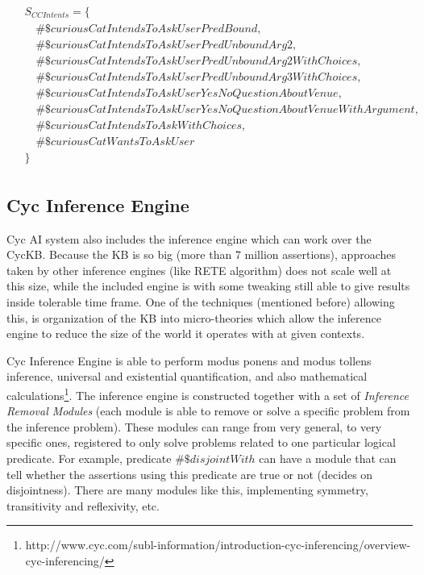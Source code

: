 \begin{equation}\label{as:cycCCAssertions}
\begin{gathered}
\begin{aligned}
&S_{CC Intents}=\{\\
&\quad\#\$curiousCatIntendsToAskUserPredBound,\\
&\quad\#\$curiousCatIntendsToAskUserPredUnboundArg2,\\
&\quad\#\$curiousCatIntendsToAskUserPredUnboundArg2WithChoices,\\
&\quad\#\$curiousCatIntendsToAskUserPredUnboundArg3WithChoices,\\
&\quad\#\$curiousCatIntendsToAskUserYesNoQuestionAboutVenue,\\
&\quad\#\$curiousCatIntendsToAskUserYesNoQuestionAboutVenueWithArgument,\\
&\quad\#\$curiousCatIntendsToAskWithChoices,\\
&\quad\#\$curiousCatWantsToAskUser\\
&\}
\end{aligned}
\end{gathered}
\end{equation}

\subsection{Cyc Inference Engine}
\label{section:cycinference}
Cyc AI system also includes the inference engine which can work over the CycKB.
Because the KB is so big (more than 7 million assertions), approaches taken
by other inference engines (like RETE algorithm) does not scale well at this
size, while the included engine is with some tweaking still able to give 
results inside tolerable time frame. One of the techniques (mentioned before)
allowing this, is organization of the KB into micro-theories which allow the 
inference engine to reduce the size of the world it operates with at given
contexts.

Cyc Inference Engine is able to perform modus ponens and modus tollens 
inference, universal and existential quantification, and also mathematical 
calculations\footnote{http://www.cyc.com/subl-information/introduction-cyc-inferencing/overview-cyc-inferencing/}. The inference engine is constructed together
with a set of \emph{Inference Removal Modules} (each module is able to remove or
solve a specific problem from the inference problem). These modules can range
from very general, to very specific ones, registered to only solve problems
related to one particular logical predicate. For example, predicate 
$\#\$disjointWith$ can have a module that can tell whether the assertions using
this predicate are true or not (decides on disjointness). There are many
modules like this, implementing symmetry, transitivity and reflexivity, etc.

